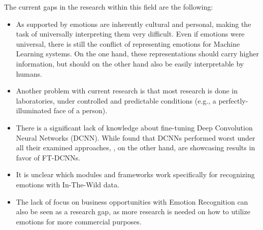The current gaps in the research within this field are the following:\newline
\begin{itemize}
    \item As supported by \citet{Salah:2018:VideoBasedER} emotions are inherently cultural and personal, making the task of universally interpreting them very difficult. Even if emotions were universal, there is still the conflict of representing emotions for Machine Learning systems. On the one hand, these representations should carry higher information, but should on the other hand also be easily interpretable by humans.
    \item Another problem with current research is that most research is done in laboratories, under controlled and predictable conditions (e.g., a perfectly-illuminated face of a person).
    \item There is a significant lack of knowledge about fine-tuning Deep Convolution Neural Networks (DCNN). While \citet{Kossaifi:2017:AFEW-VADatabase} found that DCNNs performed worst under all their examined approaches, \citet{Handrich:2020:SimultaneousPredVA}, on the other hand, are showcasing results in favor of FT-DCNNs.
    \item It is unclear which modules and frameworks work specifically for recognizing emotions with In-The-Wild data.
    \item The lack of focus on business opportunities with Emotion Recognition can also be seen as a research gap, as more research is needed on how to utilize emotions for more commercial purposes.
\end{itemize}

